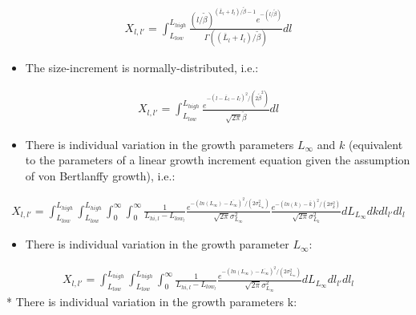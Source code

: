\documentclass[]{article}
\providecommand{\tightlist}{%
  \setlength{\itemsep}{0pt}\setlength{\parskip}{0pt}}
\begin{document}
\begin{align}

 X_{l,l'} = \int_{L_{low}}^{L_{high}} \frac {(l/\tilde{\beta})^{(\bar{L}_{l} +I_{l})/\tilde{\beta}-1} e^{-(l/\tilde{\beta})}}
                                          {\Gamma((\bar{L}_{l}+I_{l})/\tilde{\beta})} dl

 \end{align}

\begin{itemize}
\tightlist
\item
  The size-increment is normally-distributed, i.e.:
\end{itemize}

\begin{align}
 X_{l,l'} = \int_{L_{low}}^{L_{high}} \frac{e^{-(l-\bar{L}_{l}-I_{l})^{2}/(2\tilde{\beta}^{2})}}
                                          {\sqrt{2\pi}\tilde{\beta}} dl
 \end{align}

\begin{itemize}
\tightlist
\item
  There is individual variation in the growth parameters \(L_{\infty}\)
  and \(k\) (equivalent to the parameters of a linear growth increment
  equation given the assumption of von Bertlanffy growth), i.e.:
\end{itemize}

\begin{align}
  X_{l,l'} = \int_{L_{low}}^{L_{high}} \! \int_{L_{low}}^{L_{high}} \! \int_{0}^{\infty} \! \int_{0}^{\infty}
            \frac{1}{L_{hi,l}-L_{low_{l}}}
            \frac{e^{-(ln(L_{\infty})-\bar{L_{\infty}})^{2}/(2\sigma^{2}_{L_{\infty}})}}
                                          {\sqrt{2\pi}\sigma^{2}_{L_{\infty}}}
            \frac{e^{-(ln(k)-\bar{k})^{2}/(2\sigma^{2}_{k})}}
                                          {\sqrt{2\pi}\sigma^{2}_{L_{k}}}  dL_{L_{\infty}} dk dl_{l'} dl_{l}
                                          
 \end{align}

\begin{itemize}
\tightlist
\item
  There is individual variation in the growth parameter \(L_{\infty}\):
\end{itemize}

\begin{align}
  X_{l,l'} = \int_{L_{low}}^{L_{high}} \! \int_{L_{low}}^{L_{high}} \! \int_{0}^{\infty} 
            \frac{1}{L_{hi,l}-L_{low_{l}}}
            \frac{e^{-(ln(L_{\infty})-\bar{L_{\infty}})^{2}/(2\sigma^{2}_{L_{\infty}})}}
                                          {\sqrt{2\pi}\sigma^{2}_{L_{\infty}}} dL_{L_{\infty}} dl_{l'} dl_{l}
                                          
 \end{align} * There is individual variation in the growth parameters k:
\end{document}
